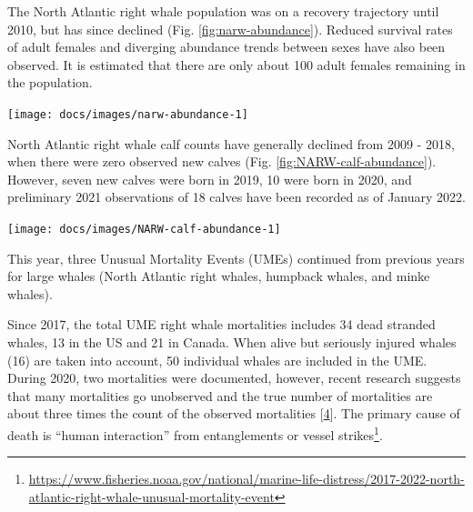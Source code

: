 \documentclass[
  10pt,
]{article}
\let\origfigure\figure
\let\endorigfigure\endfigure
\renewenvironment{figure}[1][2] {
    \expandafter\origfigure\expandafter[H]
} {
    \endorigfigure
}
\begin{document}
The North Atlantic right whale population was on a recovery trajectory
until 2010, but has since declined (Fig. \ref{fig:narw-abundance}).
Reduced survival rates of adult females and diverging abundance trends
between sexes have also been observed. It is estimated that there are
only about 100 adult females remaining in the population.

\begin{figure}

{\centering \texttt{[image: docs/images/narw-abundance-1]} 

}

\caption{Estimated North Atlanic right whale abundance on the Northeast Shelf.}\label{fig:narw-abundance}
\end{figure}

North Atlantic right whale calf counts have generally declined from 2009
- 2018, when there were zero observed new calves (Fig.
\ref{fig:NARW-calf-abundance}). However, seven new calves were born in
2019, 10 were born in 2020, and preliminary 2021 observations of 18
calves have been recorded as of January 2022.\\

\begin{figure}

{\centering \texttt{[image: docs/images/NARW-calf-abundance-1]} 

}

\caption{Number of North Atlantic right whale calf births, 1990 - 2021.}\label{fig:NARW-calf-abundance}
\end{figure}

This year, three Unusual Mortality Events (UMEs) continued from previous
years for large whales (North Atlantic right whales, humpback whales,
and minke whales).

Since 2017, the total UME right whale mortalities includes 34 dead
stranded whales, 13 in the US and 21 in Canada. When alive but seriously
injured whales (16) are taken into account, 50 individual whales are
included in the UME. During 2020, two mortalities were documented,
however, recent research suggests that many mortalities go unobserved
and the true number of mortalities are about three times the count of
the observed mortalities
{[}\protect\hyperlink{ref-pace_cryptic_2021}{4}{]}. The primary cause of
death is ``human interaction'' from entanglements or vessel
strikes\footnote{\url{https://www.fisheries.noaa.gov/national/marine-life-distress/2017-2022-north-atlantic-right-whale-unusual-mortality-event}}.
\end{document}
